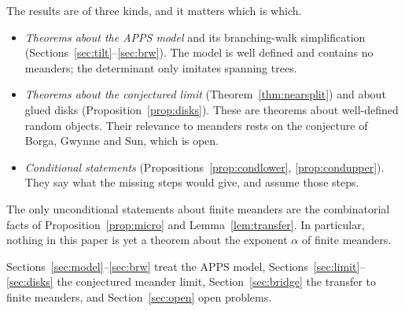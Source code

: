 The results are of three kinds, and it matters which is which.
\begin{itemize}
\item \emph{Theorems about the APPS model} and its branching-walk simplification
(Sections~\ref{sec:tilt}--\ref{sec:brw}). The model is well defined and contains no meanders; the
determinant only imitates spanning trees.
\item \emph{Theorems about the conjectured limit} (Theorem~\ref{thm:nearsplit}) and about glued
disks (Proposition~\ref{prop:disks}). These are theorems about well-defined random objects. Their
relevance to meanders rests on the conjecture of Borga, Gwynne and Sun, which is open.
\item \emph{Conditional statements} (Propositions~\ref{prop:condlower}, \ref{prop:condupper}). They
say what the missing steps would give, and assume those steps.
\end{itemize}
The only unconditional statements about finite meanders are the combinatorial facts of
Proposition~\ref{prop:micro} and Lemma~\ref{lem:transfer}. In particular, nothing in this paper is
yet a theorem about the exponent $\alpha$ of finite meanders.

Sections~\ref{sec:model}--\ref{sec:brw} treat the APPS model, Sections~\ref{sec:limit}--\ref{sec:disks}
the conjectured meander limit, Section~\ref{sec:bridge} the transfer to finite meanders, and
Section~\ref{sec:open} open problems.
